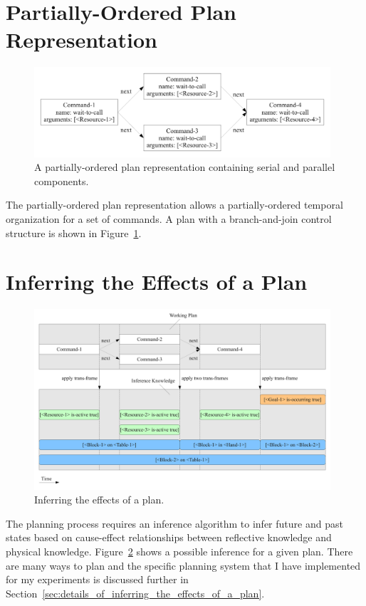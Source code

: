 \section{Partially-Ordered Plan Representation}

\begin{figure}[bth]
  \center
  \includegraphics[width=11cm]{gfx/serial_and_parallel_plan}
  \caption[A partially-ordered plan with serial and parallel
    components]{A partially-ordered plan representation containing
    serial and parallel components.}
  \label{fig:serial_and_parallel_plan}
\end{figure}

The partially-ordered plan representation allows a partially-ordered
temporal organization for a set of commands.  A plan with a
branch-and-join control structure is shown in
Figure~\ref{fig:serial_and_parallel_plan}.


\section{Inferring the Effects of a Plan}
\label{sec:inferring_the_effects_of_a_plan}

\begin{figure}[bth]
  \center
  \includegraphics[width=11cm]{gfx/infer_plan_effects}
  \caption[Inferring the effects of a plan]{Inferring the effects of
    a plan.}
  \label{fig:infer_plan_effects}
\end{figure}

The planning process requires an inference algorithm to infer future
and past states based on cause-effect relationships between reflective
knowledge and physical knowledge.  Figure~\ref{fig:infer_plan_effects}
shows a possible inference for a given plan.  There are many ways to
plan and the specific planning system that I have implemented for my
experiments is discussed further in
Section~\ref{sec:details_of_inferring_the_effects_of_a_plan}.


